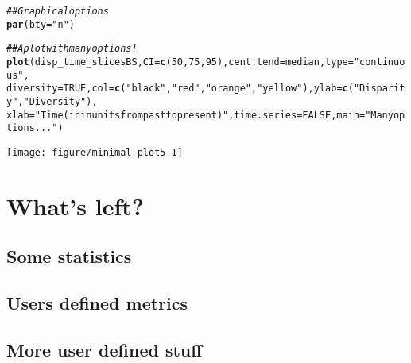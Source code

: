 \documentclass{article}\usepackage[]{graphicx}\usepackage[]{color}
\makeatletter
\newcommand{\hlnum}[1]{\textcolor[rgb]{0.686,0.059,0.569}{#1}}%
\newcommand{\hlstr}[1]{\textcolor[rgb]{0.192,0.494,0.8}{#1}}%
\newcommand{\hlcom}[1]{\textcolor[rgb]{0.678,0.584,0.686}{\textit{#1}}}%
\newcommand{\hlstd}[1]{\textcolor[rgb]{0.345,0.345,0.345}{#1}}%
\newcommand{\hlkwc}[1]{\textcolor[rgb]{0.333,0.667,0.333}{#1}}%
\newcommand{\hlkwd}[1]{\textcolor[rgb]{0.737,0.353,0.396}{\textbf{#1}}}%
\newenvironment{kframe}{%
 \def\at@end@of@kframe{}%
 \ifinner\ifhmode%
  \def\at@end@of@kframe{\end{minipage}}%
  \begin{minipage}{\columnwidth}%
 \fi\fi%
 \def\FrameCommand##1{\hskip\@totalleftmargin \hskip-\fboxsep
 \colorbox{shadecolor}{##1}\hskip-\fboxsep
     \hskip-\linewidth \hskip-\@totalleftmargin \hskip\columnwidth}%
 \MakeFramed {\advance\hsize-\width
   \@totalleftmargin\z@ \linewidth\hsize
   \@setminipage}}%
 {\par\unskip\endMakeFramed%
 \at@end@of@kframe}
\newenvironment{knitrout}{}{} %
\makeatother
\begin{document}
\begin{knitrout}
\color{fgcolor}\begin{kframe}
\begin{alltt}
\hlcom{## Graphical options}
\hlkwd{par}\hlstd{(}\hlkwc{bty} \hlstd{=} \hlstr{"n"}\hlstd{)}

\hlcom{## A plot with many options!}
\hlkwd{plot}\hlstd{(disp_time_slicesBS,} \hlkwc{CI} \hlstd{=} \hlkwd{c}\hlstd{(}\hlnum{50}\hlstd{,} \hlnum{75}\hlstd{,} \hlnum{95}\hlstd{),} \hlkwc{cent.tend} \hlstd{= median,} \hlkwc{type} \hlstd{=} \hlstr{"continuous"}\hlstd{,}
    \hlkwc{diversity} \hlstd{=} \hlnum{TRUE}\hlstd{,} \hlkwc{col} \hlstd{=} \hlkwd{c}\hlstd{(}\hlstr{"black"}\hlstd{,} \hlstr{"red"}\hlstd{,} \hlstr{"orange"}\hlstd{,} \hlstr{"yellow"}\hlstd{),} \hlkwc{ylab} \hlstd{=} \hlkwd{c}\hlstd{(}\hlstr{"Disparity"}\hlstd{,} \hlstr{"Diversity"}\hlstd{),}
    \hlkwc{xlab} \hlstd{=} \hlstr{"Time (in in units from past to present)"}\hlstd{,} \hlkwc{time.series} \hlstd{=} \hlnum{FALSE}\hlstd{,} \hlkwc{main} \hlstd{=} \hlstr{"Many options..."}\hlstd{)}
\end{alltt}
\end{kframe}

{\centering \texttt{[image: figure/minimal-plot5-1]} 

}



\end{knitrout}

\section{What's left?}
\label{whatsleft}
\subsection{Some statistics}
\subsection{Users defined metrics}
\subsection{More user defined stuff}



\end{document}
